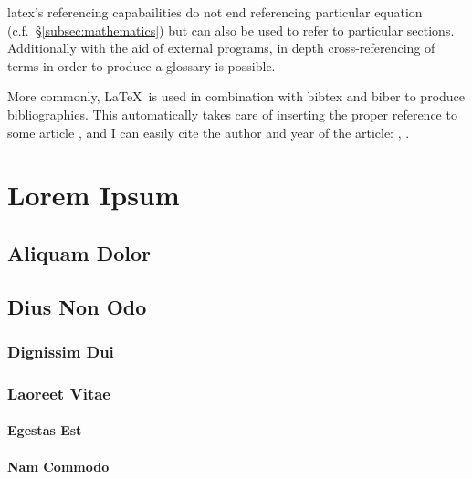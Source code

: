\documentclass[twoside, onecolumn, bibliography=totoc, parskip=half*]{scrartcl}
\begin{document}
\Gls{latex}'s referencing capabailities do not end referencing particular equation
(c.f.~\S\ref{subsec:mathematics}) but can also be used to refer to particular
sections.  Additionally with the aid of external programs, in depth
cross-referencing of terms in order to produce a \gls{glossary} is possible.

More commonly, \LaTeX~is used in combination with \gls{bibtex} and \gls{biber} to
produce bibliographies.  This automatically takes care of inserting the proper
reference to some article \cite{Smith2013}, and I can easily cite the author and
year of the article: \citeauthor{Smith2013}, \citeyear{Smith2013}.


\clearpage
\section{Lorem Ipsum}

\lipsum[1-4]

\subsection{Aliquam Dolor}

\lipsum[6-9]

\subsection{Dius Non Odo}

\lipsum[10]

\subsubsection{Dignissim Dui}

\lipsum[11-12]

\subsubsection{Laoreet Vitae}

\lipsum[13-15]

\paragraph{Egestas Est} \lipsum[16]

\paragraph{Nam Commodo} \lipsum[17]

\lipsum[18-22]


\cleardoublepage
\appendix
{}
\pagestyle{plain}

\cleardoublepage

\printglossaries

\cleardoublepage
\pagestyle{plain}
\printbibliography
\end{document}
